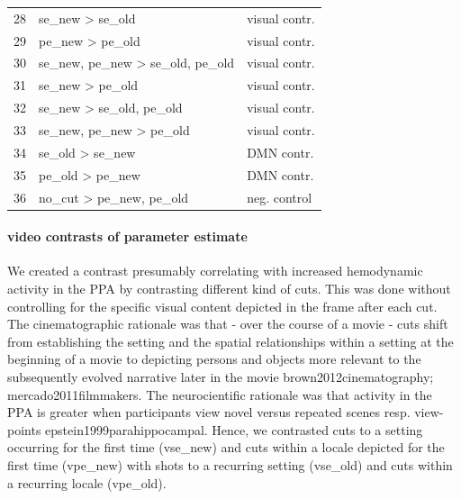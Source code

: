 \documentclass[english]{article}
\begin{document}
\begin{table}
\begin{tabular}{lll}
28 & se\_new > se\_old & visual contr. \\
29 & pe\_new > pe\_old & visual contr. \\
30 & se\_new, pe\_new > se\_old, pe\_old & visual contr. \\
31 & se\_new > pe\_old & visual contr. \\
32 & se\_new > se\_old, pe\_old & visual contr. \\
33 & se\_new, pe\_new > pe\_old & visual contr. \\
34 & se\_old > se\_new & DMN  contr. \\
35 & pe\_old > pe\_new &  DMN contr. \\
36 & no\_cut > pe\_new, pe\_old & neg. control \\
\bottomrule
\end{tabular}
\end{table}

\paragraph{video contrasts of parameter estimate}
We created a contrast presumably correlating with increased hemodynamic activity in the PPA by contrasting different kind of cuts. This was done without controlling for the specific visual content depicted in the frame after each cut. The cinematographic rationale was that - over the course of a movie - cuts shift from establishing the setting and the spatial relationships within a setting at the beginning of a movie to depicting persons and objects more relevant to the subsequently evolved narrative later in the movie {brown2012cinematography; mercado2011filmmakers}. The neurocientific rationale was that activity in the PPA is greater when participants view novel versus repeated scenes resp. view-points {epstein1999parahippocampal}. Hence, we contrasted cuts to a setting occurring for the first time (vse\_new) and cuts within a locale depicted for the first time (vpe\_new) with shots to a recurring setting (vse\_old) and cuts within a recurring locale (vpe\_old). 
\end{document}
